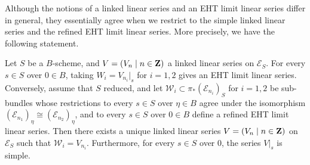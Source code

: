 Although the notions of a linked linear series and an EHT limit linear series differ in general, they essentially agree when we restrict to the simple linked linear series and the refined EHT limit linear series.
More precisely, we have the following statement.
\begin{proposition}\label{prop:llseht}
  Let $S$ be a $B$-scheme, and $V = (V_n \mid n \in {\bf Z})$ a linked linear series on $\mathcal E_S$.
  For every $s \in S$ over $0 \in B$, taking $W_i = V_{n_i}|_s$ for $i = 1, 2$ gives an EHT limit linear series.
  Conversely, assume that $S$ reduced, and let $\mathcal W_i \subset \pi_*(\mathcal E_{n_i})_S$ for $i = 1,2$ be sub-bundles whose restrictions to every $s \in S$ over $\eta \in B$ agree under the isomorphism $(\mathcal E_{n_1})_\eta \cong (\mathcal E_{n_2})_\eta$, and to every $s \in S$ over $0 \in B$ define a refined EHT limit linear series.
  Then there exists a unique linked linear series $V = (V_n \mid n \in {\bf Z})$ on $\mathcal E_S$ such that $\mathcal W_i = V_{n_i}$.
  Furthermore, for every $s \in S$ over $0$, the series $V|_s$ is simple.
\end{proposition}
